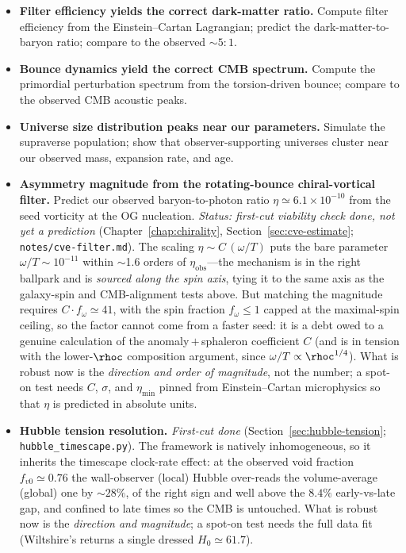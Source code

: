 \begin{itemize}
  \item \textbf{Filter efficiency yields the correct dark-matter ratio.} Compute
    filter efficiency from the Einstein--Cartan Lagrangian; predict the
    dark-matter-to-baryon ratio; compare to the observed $\sim 5\!:\!1$.
  \item \textbf{Bounce dynamics yield the correct CMB spectrum.} Compute the
    primordial perturbation spectrum from the torsion-driven bounce; compare to
    the observed CMB acoustic peaks.
  \item \textbf{Universe size distribution peaks near our parameters.} Simulate
    the supraverse population; show that observer-supporting universes cluster
    near our observed mass, expansion rate, and age.
  \item \textbf{Asymmetry magnitude from the rotating-bounce chiral-vortical
    filter.} Predict our observed baryon-to-photon ratio
    $\eta\simeq6.1\times10^{-10}$ from the seed vorticity at the OG nucleation.
    \emph{Status: first-cut viability check done, not yet a prediction}
    (Chapter~\ref{chap:chirality}, Section~\ref{sec:cve-estimate};
    \texttt{notes/cve-filter.md}). The scaling $\eta\sim C\,(\omega/T)$ puts the
    bare parameter $\omega/T\sim10^{-11}$ within $\sim$1.6 orders of
    $\eta_{\mathrm{obs}}$---the mechanism is in the right ballpark and is
    \emph{sourced along the spin axis}, tying it to the same axis as the
    galaxy-spin and CMB-alignment tests above. But matching the magnitude requires
    $C\cdot f_\omega\simeq41$, with the spin fraction $f_\omega\le1$ capped at the
    maximal-spin ceiling, so the factor cannot come from a faster seed: it is a
    debt owed to a genuine calculation of the anomaly\,$+$\,sphaleron coefficient
    $C$ (and is in tension with the lower-$\rhoc$ composition argument, since
    $\omega/T\propto\rhoc^{1/4}$). What is robust now is the \emph{direction and
    order of magnitude}, not the number; a spot-on test needs $C$, $\sigma$, and
    $\eta_{\min}$ pinned from Einstein--Cartan microphysics so that $\eta$ is
    predicted in absolute units.
  \item \textbf{Hubble tension resolution.} \emph{First-cut done}
    (Section~\ref{sec:hubble-tension}; \texttt{hubble\_timescape.py}). The
    framework is natively inhomogeneous, so it inherits the timescape clock-rate
    effect: at the observed void fraction $f_{v0}\simeq0.76$ the wall-observer
    (local) Hubble over-reads the volume-average (global) one by $\sim28\%$, of
    the right sign and well above the $8.4\%$ early-vs-late gap, and confined to
    late times so the CMB is untouched. What is robust now is the
    \emph{direction and magnitude}; a spot-on test needs the full data fit
    (Wiltshire's returns a single dressed $H_0\simeq61.7$).
\end{itemize}

